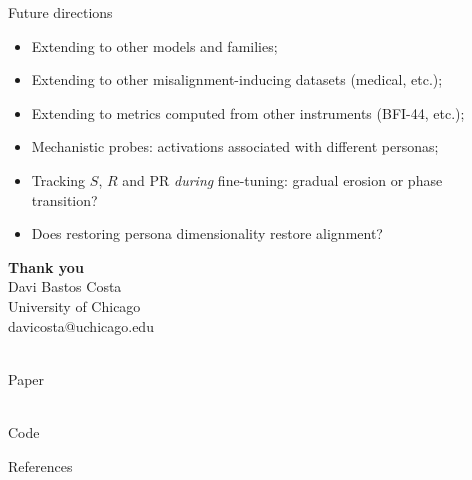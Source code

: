 \documentclass[aspectratio=169]{beamer}
\begin{document}
\begin{frame}{Future directions}
  \vspace{0.6em}
  \begin{itemize}
    \item Extending to other models and families;\hfill{\checkmark}
    \item Extending to other misalignment-inducing datasets (medical, etc.); \hfill{\checkmark}
    \item Extending to metrics computed from other instruments (BFI-44, etc.);\hfill{\checkmark}
    \item Mechanistic probes: activations associated with different personas;\hfill{\LEFTcircle}
    \item Tracking $S$, $R$ and PR \emph{during} fine-tuning: gradual erosion or phase transition?
    \item Does restoring persona dimensionality restore alignment?
  \end{itemize}
\end{frame}

\begin{frame}[plain]
  \vfill\centering
  {\Large\bfseries Thank you}\\[1.2em]
  {\normalsize Davi Bastos Costa}\\[0.4em]
  {\small\color{black!50} University of Chicago}\\[0.6em]
  {\small\color{black!45} davicosta@uchicago.edu}\\[1.2em]
  \begin{minipage}[t]{0.28\textwidth}
    \centering
    {\setlength{\fboxsep}{0.15em}\colorbox{white}{\color{black}}}\\[0.4em]
    {\scriptsize\color{black!50} Paper}
  \end{minipage}\hspace{2em}
  \begin{minipage}[t]{0.28\textwidth}
    \centering
    {\setlength{\fboxsep}{0.15em}\colorbox{white}{\color{black}}}\\[0.4em]
    {\scriptsize\color{black!50} Code}
  \end{minipage}
  \vfill
\end{frame}

\begin{frame}[allowframebreaks]{References}
  
  
\end{frame}
\end{document}
